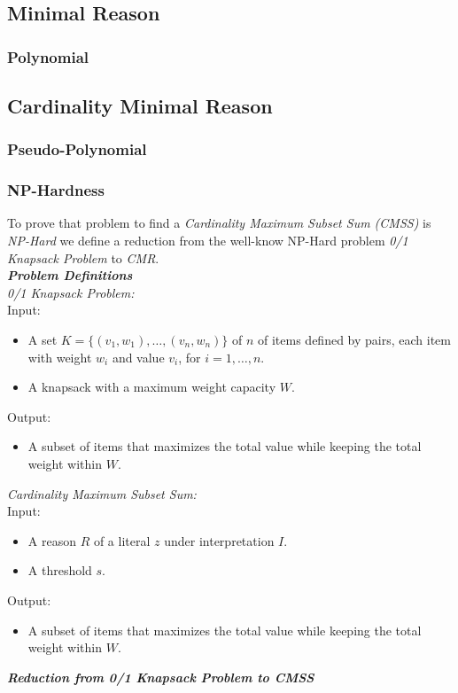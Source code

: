 \subsection{Minimal Reason}
\subsubsection{Polynomial}
\subsection{Cardinality Minimal Reason}
\subsubsection{Pseudo-Polynomial}
\subsubsection{NP-Hardness}
\label{subsubsection:hardness}

To prove that problem to find a \textit{Cardinality Maximum Subset Sum (CMSS)}
is \textit{NP-Hard} we define a reduction from the well-know NP-Hard problem 
\textit{0/1 Knapsack Problem} to \textit{CMR}.\\
\textbf{\textit{Problem Definitions}}\\
\textit{0/1 Knapsack Problem:}\\
Input:
    \begin{itemize}
        \item A set $K=\{(v_1,w_1),\hdots,(v_n,w_n)\}$ of \( n \) of 
        items defined by pairs, each item with weight \( w_i \) and value \( v_i \), for \( i = 1, \ldots, n \).
        \item A knapsack with a maximum weight capacity \( W \).
    \end{itemize}
Output:
    \begin{itemize}
        \item A subset of items that maximizes the total value while keeping the total weight within \( W \).
    \end{itemize}
\textit{Cardinality Maximum Subset Sum:}\\
Input:
    \begin{itemize}
        \item A reason $R$ of a literal $z$ under interpretation $I$.
        \item A threshold $s$.
    \end{itemize}
Output:
    \begin{itemize}
        \item A subset of items that maximizes the total value while keeping the total weight within \( W \).
    \end{itemize}
\textbf{\textit{Reduction from 0/1 Knapsack Problem to CMSS}}



